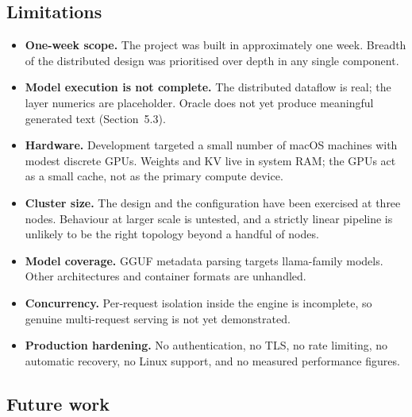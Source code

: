 \documentclass[11pt,a4paper]{article}
\begin{document}
\subsection{Limitations}

\begin{itemize}
  \item \textbf{One-week scope.} The project was built in approximately one week.
        Breadth of the distributed design was prioritised over depth in any single
        component.
  \item \textbf{Model execution is not complete.} The distributed dataflow is
        real; the layer numerics are placeholder. Oracle does not yet produce
        meaningful generated text (Section~5.3).
  \item \textbf{Hardware.} Development targeted a small number of macOS machines
        with modest discrete GPUs. Weights and KV live in system RAM; the GPUs
        act as a small cache, not as the primary compute device.
  \item \textbf{Cluster size.} The design and the configuration have been
        exercised at three nodes. Behaviour at larger scale is untested, and a
        strictly linear pipeline is unlikely to be the right topology beyond a
        handful of nodes.
  \item \textbf{Model coverage.} GGUF metadata parsing targets llama-family
        models. Other architectures and container formats are unhandled.
  \item \textbf{Concurrency.} Per-request isolation inside the engine is
        incomplete, so genuine multi-request serving is not yet demonstrated.
  \item \textbf{Production hardening.} No authentication, no TLS, no rate
        limiting, no automatic recovery, no Linux support, and no measured
        performance figures.
\end{itemize}

\subsection{Future work}
\end{document}
